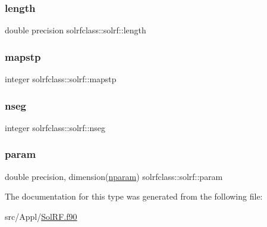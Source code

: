 \subsubsection{\texorpdfstring{length}{length}}
{\footnotesize\ttfamily double precision solrfclass\+::solrf\+::length}

\mbox{\label{structsolrfclass_1_1solrf_af5533539dedb70fb85e93b1a76a7a55d}} 
\subsubsection{\texorpdfstring{mapstp}{mapstp}}
{\footnotesize\ttfamily integer solrfclass\+::solrf\+::mapstp}

\mbox{\label{structsolrfclass_1_1solrf_a1825472ba9b6dfe1d7ca72bfc85f0532}} 
\subsubsection{\texorpdfstring{nseg}{nseg}}
{\footnotesize\ttfamily integer solrfclass\+::solrf\+::nseg}

\mbox{\label{structsolrfclass_1_1solrf_a10deafd1e7cbd79c86c62766f73105f9}} 
\subsubsection{\texorpdfstring{param}{param}}
{\footnotesize\ttfamily double precision, dimension(\mbox{\hyperlink{namespacesolrfclass_a01b965e25069cff9fb1797fbbcb9939d}{nparam}}) solrfclass\+::solrf\+::param}



The documentation for this type was generated from the following file\+:\begin{DoxyCompactItemize}
\item 
src/\+Appl/\mbox{\hyperlink{_sol_r_f_8f90}{Sol\+R\+F.\+f90}}\end{DoxyCompactItemize}
